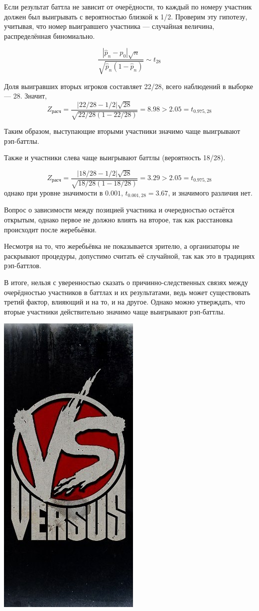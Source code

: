 \documentclass[a4paper]{article}
\theoremstyle{plain} %
\theoremstyle{definition}
\theoremstyle{remark}
\begin{document}
Если результат баттла не зависит от очерёдности, то каждый по номеру участник должен был выигрывать с вероятностью близкой к 1/2. Проверим эту гипотезу, учитывая, что номер выигравшего участника --- случайная величина, распределённая биномиально.

$$\frac{|\hat p_n-p_0|\sqrt{n}}{\sqrt{\hat p_n(1-\hat p_n)}}\sim t_{28}$$

Доля выигравших вторых игроков составляет 22/28, всего наблюдений в выборке --- 28. Значит,
$$Z_{расч}=\frac{|22/28-1/2|\sqrt{28}}{\sqrt{22/28(1-22/28)}}=8.98>2.05=t_{0.975, 28} $$

Таким образом, выступающие вторыми участники значимо чаще выигрывают рэп-баттлы.

Также и участники слева чаще выигрывают баттлы (вероятность 18/28).

$$Z_{расч}=\frac{|18/28-1/2|\sqrt{28}}{\sqrt{18/28(1-18/28)}}=3.29>2.05=t_{0.975,28} $$
однако при уровне значимости в $0.001$, $t_{0.001,28}=3.67$, и значимого различия нет.

Вопрос о зависимости между позицией участника и очередностью остаётся открытым, однако первое не должно влиять на второе, так как расстановка происходит после жеребьёвки.

Несмотря на то, что жеребьёвка не показывается зрителю, а организаторы не раскрывают процедуры, допустимо считать её случайной, так как это в традициях рэп-баттлов.

В итоге, нельзя с уверенностью сказать о причинно-следственных связях между очерёдностью участников в баттлах и их результатами, ведь может существовать третий фактор, влияющий и на то, и на другое. Однако можно утверждать, что вторые участники действительно значимо чаще выигрывают рэп-баттлы.

\vspace{1cm}
\begin{center}
\includegraphics[scale=.25]{versus.jpg}
\end{center}
\end{document}
